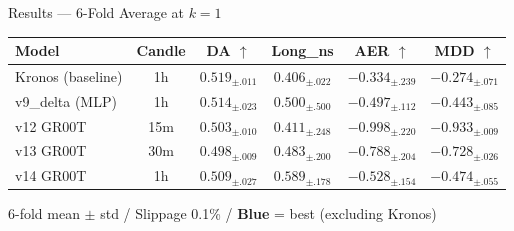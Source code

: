 \documentclass[aspectratio=169,11pt]{beamer}
\newcommand{\best}[1]{\textcolor{bestcol}{\textbf{#1}}}
\begin{document}
\begin{frame}{Results --- 6-Fold Average at $k=1$}
  \begin{table}
    \centering
    \renewcommand{\arraystretch}{1.4}
    \setlength{\tabcolsep}{5pt}
    \begin{tabular}{lc cccc}
      \toprule
      \textbf{Model} & \textbf{Candle} &
        \textbf{DA} $\uparrow$ & \textbf{Long\_ns} &
        \textbf{AER} $\uparrow$ & \textbf{MDD} $\uparrow$ \\
      \midrule
      \rowcolor{rowgray}
      Kronos (baseline) & 1h &
        $0.519_{\pm.011}$ & $0.406_{\pm.022}$ &
        $-0.334_{\pm.239}$ & $-0.274_{\pm.071}$ \\
      v9\_delta (MLP) & 1h &
        \best{$0.514_{\pm.023}$} & $0.500_{\pm.500}$ &
        \best{$-0.497_{\pm.112}$} & \best{$-0.443_{\pm.085}$} \\
      \rowcolor{rowgray}
      v12 GR00T & 15m &
        $0.503_{\pm.010}$ & $0.411_{\pm.248}$ &
        $-0.998_{\pm.220}$ & $-0.933_{\pm.009}$ \\
      v13 GR00T & 30m &
        $0.498_{\pm.009}$ & $0.483_{\pm.200}$ &
        $-0.788_{\pm.204}$ & $-0.728_{\pm.026}$ \\
      \rowcolor{rowgray}
      v14 GR00T & 1h &
        $0.509_{\pm.027}$ & $0.589_{\pm.178}$ &
        $-0.528_{\pm.154}$ & $-0.474_{\pm.055}$ \\
      \bottomrule
    \end{tabular}
    \par\vspace{0.3em}\centering\footnotesize 6-fold mean $\pm$ std / Slippage 0.1\% / \textcolor{bestcol}{\textbf{Blue}} = best (excluding Kronos)
  \end{table}
\end{frame}
\end{document}
